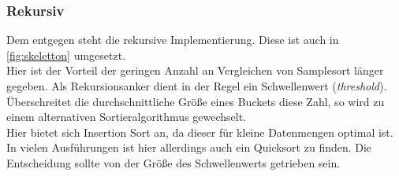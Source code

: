 		\subsubsection{Rekursiv}
			Dem entgegen steht die rekursive Implementierung.
			Diese ist auch in \ref{fig:skeletton} umgesetzt.\\
			Hier ist der Vorteil der geringen Anzahl an Vergleichen von Samplesort länger gegeben.
			Als Rekursionsanker dient in der Regel ein Schwellenwert (\textit{threshold}).
			Überschreitet die durchschnittliche Größe eines Buckets diese Zahl, so wird zu einem alternativen Sortieralgorithmus gewechselt.\\
			Hier bietet sich Insertion Sort an, da dieser für kleine Datenmengen optimal ist. \autocite{geeksforgeeks-2021} 
			In vielen Ausführungen ist hier allerdings auch ein Quicksort zu finden.
			Die Entscheidung sollte von der Größe des Schwellenwerts getrieben sein.
